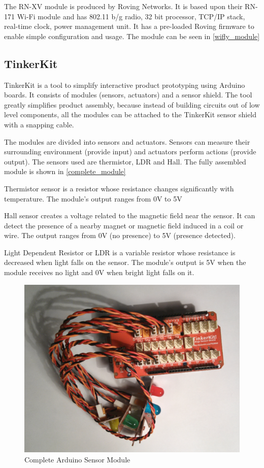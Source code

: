 The RN-XV module \cite{rn_xv_module} is produced by Roving Networks. It is based upon their RN-171 Wi-Fi module and has 802.11 b/g radio, 32 bit processor, TCP/IP stack, real-time clock, power management unit. It has a pre-loaded Roving firmware to enable simple configuration and usage. The module can be seen in \autoref{wifly_module}

\subsection{TinkerKit}

TinkerKit \cite{tinkerkit_introduction} is a tool to simplify interactive product prototyping using Arduino boards. It consists of modules (sensors, actuators) and a sensor shield. The tool greatly simplifies product assembly, because instead of building circuits out of low level components, all the modules can be attached to the TinkerKit sensor shield with a snapping cable.

The modules are divided into sensors and actuators. Sensors can measure their surrounding environment (provide input) and actuators perform actions (provide output). The sensors used are thermistor, LDR and Hall. The fully assembled module is shown in \autoref{complete_module}

Thermistor sensor \cite{thermistor_sensor} is a resistor whose resistance changes significantly with temperature. The module's output ranges from 0V to 5V

Hall sensor \cite{hall_sensor} creates a voltage related to the magnetic field near the sensor. It can detect the presence of a nearby magnet or magnetic field induced in a coil or wire. The output ranges from 0V (no presence) to 5V (presence detected). 

Light Dependent Resistor or LDR \cite{light_sensor} is a variable resistor whose resistance is decreased when light falls on the sensor. The module's output is 5V when the module receives no light and 0V when bright light falls on it.

\begin{figure}[h!]
\centering
\includegraphics[scale=0.53]{2/figures/complete_module.pdf}
\caption{Complete Arduino Sensor Module}
\label{complete_module}
\end{figure}	


